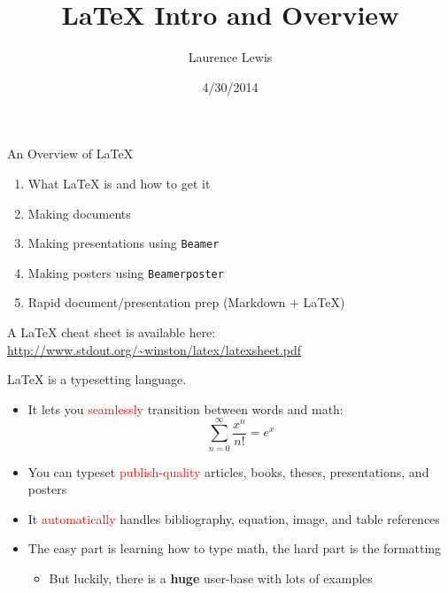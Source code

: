 \documentclass{beamer}
\title{\LaTeX{} Intro and Overview}
\author{Laurence Lewis}
\institute{\texttt{lewisla@berkeley.edu}}
\date{4/30/2014}
\begin{document}


\begin{frame}
  \titlepage
\end{frame}



\begin{frame}{An Overview of \LaTeX{}}
	\begin{enumerate}
    	\item What \LaTeX{} is and how to get it
        \item Making documents
        \item Making presentations using \texttt{Beamer}
        \item Making posters using \texttt{Beamerposter}
        \item Rapid document/presentation prep (Markdown + \LaTeX{})
     \end{enumerate}
     \vfill
     A \LaTeX{} cheat sheet is available here:      \url{http://www.stdout.org/~winston/latex/latexsheet.pdf}
\end{frame}

\begin{frame}{\LaTeX{} is a typesetting language.}

	\begin{itemize} %
  	\item It lets you \textcolor{red}{seamlessly} transition between words and math: 
  	$$\sum_{n=0}^\infty\frac{x^n}{n!}=e^x$$
  	\item You can typeset \textcolor{red}{publish-quality} articles, books, theses, presentations, and posters
  	\item It \textcolor{red}{automatically} handles bibliography, equation, image, and table references
  	\item The easy part is learning how to type math, the hard part is the formatting
  		\begin{itemize}
    		\item But luckily, there is a \textbf{huge} user-base with lots of examples
    	\end{itemize}
	\end{itemize}
    
\end{frame}
    
\end{document}
